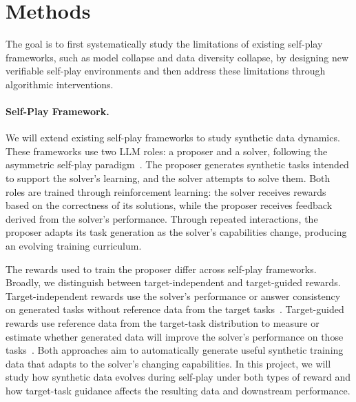 \section{Methods}
The goal is to first systematically study the limitations of existing self-play frameworks, such as model collapse and data diversity collapse, by designing new verifiable self-play environments and then address these limitations through algorithmic interventions. 

\paragraph{Self-Play Framework.}
We will extend existing self-play frameworks to study synthetic data dynamics.
These frameworks use two LLM roles: a proposer and a solver, following the asymmetric self-play paradigm~\citep{sukhbaatar2018intrinsic,zhao2025absolute,sundaram2026teaching}.
The proposer generates synthetic tasks intended to support the solver's learning, and the solver attempts to solve them.
Both roles are trained through reinforcement learning: the solver receives rewards based on the correctness of its solutions, while the proposer receives feedback derived from the solver's performance.
Through repeated interactions, the proposer adapts its task generation as the solver's capabilities change, producing an evolving training curriculum.

The rewards used to train the proposer differ across self-play frameworks.
Broadly, we distinguish between target-independent and target-guided rewards.
Target-independent rewards use the solver's performance or answer consistency on generated tasks without reference data from the target tasks~\citep{zhao2025absolute,huang2026rzero}.
Target-guided rewards use reference data from the target-task distribution to measure or estimate whether generated data will improve the solver's performance on those tasks~\citep{pu2026compassplay,sundaram2026teaching}.
Both approaches aim to automatically generate useful synthetic training data that adapts to the solver's changing capabilities.
In this project, we will study how synthetic data evolves during self-play under both types of reward and how target-task guidance affects the resulting data and downstream performance.



